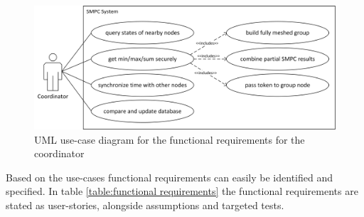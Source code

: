 	\begin{figure}[!htb] %
	\caption{\gls{UML} use-case diagram for the functional requirements for the coordinator} \label{figure:requirements use-case coordinator}
	\includegraphics[scale=0.75]{figures/use-case-coordinator.png}
	\end{figure}

	Based on the use-cases functional requirements can easily be identified and specified. In table \ref{table:functional requirements} the functional requirements are stated as user-stories, alongside assumptions and targeted tests.


